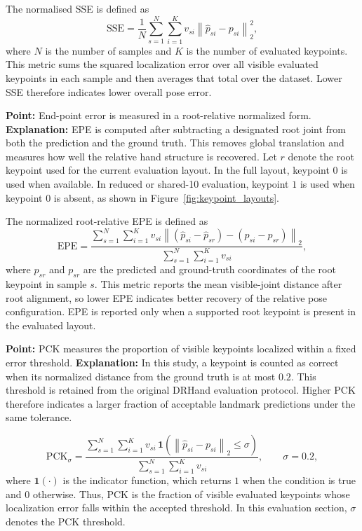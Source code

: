 \documentclass[10pt,letterpaper]{article}
\begin{document}
The normalised SSE is defined as
\begin{equation}
\mathrm{SSE} =
\frac{1}{N}
\sum_{s=1}^{N}
\sum_{i=1}^{K}
v_{si}\left\|
\hat{p}_{si} - p_{si}
\right\|_2^2,
\label{eq:sse}
\end{equation}
where \(N\) is the number of samples and \(K\) is the number of evaluated keypoints. This metric sums the squared localization error over all visible evaluated keypoints in each sample and then averages that total over the dataset. Lower SSE therefore indicates lower overall pose error.

\medskip
\noindent\textbf{Point:} End-point error is measured in a root-relative normalized form.  
\textbf{Explanation:} EPE is computed after subtracting a designated root joint from both the prediction and the ground truth. This removes global translation and measures how well the relative hand structure is recovered. Let \(r\) denote the root keypoint used for the current evaluation layout. In the full layout, keypoint \(0\) is used when available. In reduced or shared-10 evaluation, keypoint \(1\) is used when keypoint \(0\) is absent, as shown in Figure~\ref{fig:keypoint_layouts}.

The normalized root-relative EPE is defined as
\begin{equation}
\mathrm{EPE} =
\frac{
\sum_{s=1}^{N}
\sum_{i=1}^{K}
v_{si}
\left\|
(\hat{p}_{si} - \hat{p}_{sr}) - (p_{si} - p_{sr})
\right\|_2
}{
\sum_{s=1}^{N}
\sum_{i=1}^{K}
v_{si}
},
\label{eq:epe}
\end{equation}
where \(\hat{p}_{sr}\) and \(p_{sr}\) are the predicted and ground-truth coordinates of the root keypoint in sample \(s\). This metric reports the mean visible-joint distance after root alignment, so lower EPE indicates better recovery of the relative pose configuration. EPE is reported only when a supported root keypoint is present in the evaluated layout.

\medskip
\noindent\textbf{Point:} PCK measures the proportion of visible keypoints localized within a fixed error threshold.  
\textbf{Explanation:} In this study, a keypoint is counted as correct when its normalized distance from the ground truth is at most \(0.2\). This threshold is retained from the original DRHand evaluation protocol. Higher PCK therefore indicates a larger fraction of acceptable landmark predictions under the same tolerance.

\begin{equation}
\mathrm{PCK}_{\sigma} =
\frac{
\sum_{s=1}^{N}
\sum_{i=1}^{K}
v_{si}\,\mathbf{1}
\left(
\left\|
\hat{p}_{si} - p_{si}
\right\|_2 \le \sigma
\right)
}{
\sum_{s=1}^{N}
\sum_{i=1}^{K}
v_{si}
},
\qquad \sigma = 0.2,
\label{eq:pck}
\end{equation}
where \(\mathbf{1}(\cdot)\) is the indicator function, which returns \(1\) when the condition is true and \(0\) otherwise. Thus, PCK is the fraction of visible evaluated keypoints whose localization error falls within the accepted threshold. In this evaluation section, \(\sigma\) denotes the PCK threshold.
\end{document}
